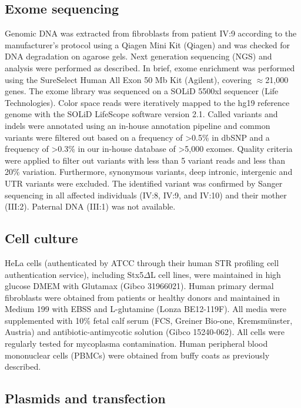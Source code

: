 \subsection{Exome sequencing}

Genomic DNA was extracted from fibroblasts from patient IV:9 according to the manufacturer’s protocol using a Qiagen Mini Kit (Qiagen) and was checked for DNA degradation on agarose gels. Next generation sequencing (NGS) and analysis were performed as described\cite{jansen_tmem199_2016}. In brief, exome enrichment was performed using the SureSelect Human All Exon 50 Mb Kit (Agilent), covering $\approx$21,000 genes. The exome library was sequenced on a SOLiD 5500xl sequencer (Life Technologies). Color space reads were iteratively mapped to the hg19 reference genome with the SOLiD LifeScope software version 2.1. Called variants and indels were annotated using an in-house annotation pipeline\cite{vissers_novo_2010,nikopoulos_next-generation_2010} and common variants were filtered out based on a frequency of >0.5\% in dbSNP and a frequency of >0.3\% in our in-house database of >5,000 exomes. Quality criteria were applied to filter out variants with less than 5 variant reads and less than 20\% variation. Furthermore, synonymous variants, deep intronic, intergenic and UTR variants were excluded. The identified variant was confirmed by Sanger sequencing in all affected individuals (IV:8, IV:9, and IV:10) and their mother (III:2). Paternal DNA (III:1) was not available.

\subsection{Cell culture}

HeLa cells (authenticated by ATCC through their human STR profiling cell authentication service), including Stx5$\Delta$L cell lines, were maintained in high glucose DMEM with Glutamax (Gibco 31966021). Human primary dermal fibroblasts were obtained from patients or healthy donors and maintained in Medium 199 with EBSS and L-glutamine (Lonza BE12-119F). All media were supplemented with 10\% fetal calf serum (FCS, Greiner Bio-one, Kremsmünster, Austria) and antibiotic-antimycotic solution (Gibco 15240-062). All cells were regularly tested for mycoplasma contamination. Human peripheral blood mononuclear cells (PBMCs) were obtained from buffy coats as previously described\cite{jolanda_phenotypical_2005}.

\subsection{Plasmids and transfection}

